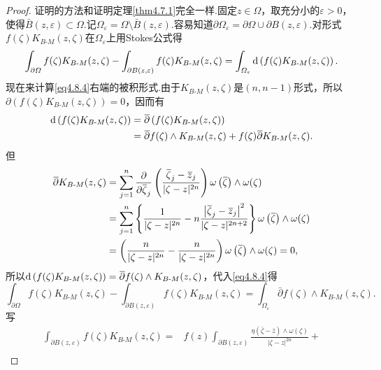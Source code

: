 \begin{proof}
	证明的方法和证明定理\ref{thm4.7.1}完全一样.固定$z\in\Omega$，取充分小的$\varepsilon>0$，使得$\bar{B}(z,\varepsilon)\subset\Omega$.记$\Omega_\varepsilon=\Omega\setminus\bar{B}(z,\varepsilon)$.容易知道$\partial\Omega_\varepsilon=\partial\Omega\cup\partial B(z,\varepsilon)$.对形式$f(\zeta)K_{B\text{-}M}(z,\zeta)$在$\Omega_\varepsilon$上用Stokes公式得
	\begin{equation}\label{eq4.8.4}
		\int_{\partial\varOmega}f(\zeta)K_{B\text{-}M}(z,\zeta)-\int_{\partial B(z,\varepsilon)}f(\zeta)K_{B\text{-}M}(z,\zeta)=\int_{\varOmega_\varepsilon}\mathop{}\!\mathrm{d}\left(f(\zeta)K_{B\text{-}M}(z,\zeta)\right).
	\end{equation}
现在来计算\eqref{eq4.8.4}右端的被积形式.由于$K_{B\text{-}M}(z,\zeta)$是$(n,n-1)$形式，所以\\
$\partial\left(f(\zeta)K_{B\text{-}M}(z,\zeta)\right)=0$，因而有
\begin{align*}
	\mathop{}\!\mathrm{d}\left(f(\zeta)K_{B\text{-}M}(z,\zeta)\right)
	&={}\mkern1mu\overline{\mkern-1mu\partial}\left(f(\zeta)K_{B\text{-}M}(z,\zeta)\right)\\
	&={}\mkern1mu\overline{\mkern-1mu\partial}f(\zeta)\wedge K_{B\text{-}M}(z,\zeta)+f(\zeta){}\mkern1mu\overline{\mkern-1mu\partial} K_{B\text{-}M}(z,\zeta).
\end{align*}
但
\begin{align*}
	{}\mkern1mu\overline{\mkern-1mu\partial}K_{B\text{-}M}(z,\zeta)
	&=\sum_{j=1}^{n}\frac{\partial }{\partial {}\mkern1mu\overline{\mkern-1mu\zeta}_j} \left(\frac{{}\mkern1mu\overline{\mkern-1mu\zeta}_j-{}\mkern1mu\overline{\mkern-1muz}_j}{|\zeta-z|^{2n}}\right)\omega\left({}\mkern1mu\overline{\mkern-1mu\zeta}\right)\wedge\omega(\zeta)\\
	&=\sum_{j=1}^{n}\left\{\frac1{|\zeta-z|^{2n}}-n\frac{\left|{}\mkern1mu\overline{\mkern-1mu\zeta}_j-{}\mkern1mu\overline{\mkern-1muz}_j\right|^2}{|\zeta-z|^{2n+2}}\right\}\omega\left({}\mkern1mu\overline{\mkern-1mu\zeta}\right)\wedge\omega(\zeta)\\
	&=\left(\frac{n}{|\zeta-z|^{2n}}-\frac{n}{|\zeta-z|^{2n}}\right)\omega\left({}\mkern1mu\overline{\mkern-1mu\zeta}\right)\wedge\omega(\zeta)=0,
\end{align*}
所以$\mathop{}\!\mathrm{d}\left(f(\zeta)K_{B\text{-}M}(z,\zeta)\right)={}\mkern1mu\overline{\mkern-1mu\partial}f(\zeta)\wedge K_{B\text{-}M}(z,\zeta)$，代入\eqref{eq4.8.4}得
\begin{equation}\label{eq4.8.5}
	\int_{\partial\Omega}f(\zeta)K_{B\text{-}M}(z,\zeta)-\int_{\partial B(z,\varepsilon)}f(\zeta)K_{B\text{-}M}(z,\zeta)=\int_{\Omega_\varepsilon}\bar{\partial}f(\zeta)\wedge K_{B\text{-}M}(z,\zeta).
\end{equation}
写
\begin{align*}
	\int_{\partial B(z,\varepsilon)}f(\zeta)K_{B\text{-}M}(z,\zeta)
	=&f(z)\int_{\partial B(z,\varepsilon)}\frac{\eta\left(\bar{\zeta}-\bar{z}\right)\wedge\omega(\zeta)}{|\zeta-z|^{2n}}+\\

\end{align*}
\end{proof}
